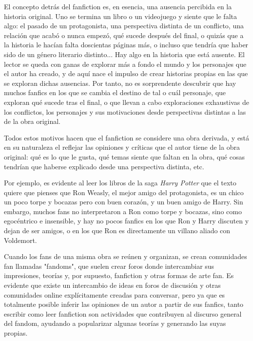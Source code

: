 \documentclass{pre-tfg}
\begin{document}
El concepto detrás del fanfiction es, en esencia, una ausencia percibida en la historia original. Uno se termina un libro o un videojuego y siente que le falta algo: el pasado de un protagonista, una perspectiva distinta de un conflicto, una relación que acabó o nunca empezó, qué sucede después del final, o quizás que a la historia le hacían falta doscientas páginas más, o incluso que tendría que haber sido de un género literario distinto... Hay algo en la historia que está ausente. El lector se queda con ganas de explorar más a fondo el mundo y los personajes que el autor ha creado, y de aquí nace el impulso de crear historias propias en las que se exploran dichas ausencias. Por tanto, no es sorprendente descubrir que hay muchos fanfics en los que se cambia el destino de tal o cuál personaje, que exploran qué sucede tras el final, o que llevan a cabo exploraciones exhaustivas de los conflictos, los personajes y sus motivaciones desde perspectivas distintas a las de la obra original.

Todos estos motivos hacen que el fanfiction se considere una obra derivada\cite{woosh_1998}, y está en su naturaleza el reflejar las opiniones y críticas que el autor tiene de la obra original: qué es lo que le gusta, qué temas siente que faltan en la obra, qué cosas tendrían que haberse explicado desde una perspectiva distinta, etc.

Por ejemplo, es evidente al leer los libros de la saga \textit{Harry Potter} que el texto quiere que pienses que Ron Weasly, el mejor amigo del protagonista, es un chico un poco torpe y bocazas pero con buen corazón, y un buen amigo de Harry. Sin embargo, muchos fans no interpretaron a Ron como torpe y bocazas, sino como egocéntrico e insensible, y hay no pocos fanfics en los que Ron y Harry discuten y dejan de ser amigos, o en los que Ron es directamente un villano aliado con Voldemort.

Cuando los fans de una misma obra se reúnen y organizan, se crean comunidades fan llamadas "fandoms", que suelen crear foros donde intercambiar sus impresiones, teorías y, por supuesto, fanfiction y otras formas de arte fan. Es evidente que existe un intercambio de ideas en foros de discusión y otras comunidades online explícitamente creadas para conversar, pero ya que es totalmente posible inferir las opiniones de un autor a partir de sus fanfics, tanto escribir como leer fanfiction son actividades que contribuyen al discurso general del fandom, ayudando a popularizar algunas teorías y generando las suyas propias.
\end{document}
